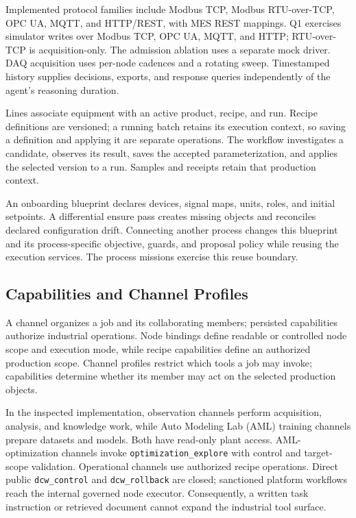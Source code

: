 Implemented protocol families include Modbus TCP, Modbus RTU-over-TCP,
OPC UA, MQTT, and HTTP/REST, with MES REST mappings. Q1 exercises simulator
writes over Modbus TCP, OPC UA, MQTT, and HTTP; RTU-over-TCP is
acquisition-only. The admission ablation uses a separate mock driver.
DAQ acquisition uses per-node cadences and a rotating sweep. Timestamped
history supplies decisions, exports, and response queries independently of
the agent's reasoning duration.

Lines associate equipment with an active product, recipe, and run. Recipe
definitions are versioned; a running batch retains its execution context,
so saving a definition and applying it are separate operations. The workflow
investigates a candidate, observes its result, saves the accepted
parameterization, and applies the selected version to a run. Samples and
receipts retain that production context.

An onboarding blueprint declares devices, signal maps, units, roles, and
initial setpoints. A differential ensure pass creates missing objects and
reconciles declared configuration drift. Connecting another process changes
this blueprint and its process-specific objective, guards, and proposal
policy while reusing the execution services. The process missions exercise
this reuse boundary.
\label{sec:reuse}

\subsection{Capabilities and Channel Profiles}
A channel organizes a job and its collaborating members; persisted
capabilities authorize industrial operations. Node bindings define readable
or controlled node scope and execution mode, while recipe capabilities
define an authorized production scope. Channel profiles restrict which tools
a job may invoke; capabilities determine whether its member may act on the
selected production objects.

In the inspected implementation, observation channels perform
acquisition, analysis, and knowledge work, while Auto Modeling Lab (AML)
training channels prepare datasets and models. Both have read-only plant
access. AML-optimization channels invoke \texttt{optimization\_explore}
with control and target-scope validation. Operational channels use
authorized recipe operations. Direct public \texttt{dcw\_control} and
\texttt{dcw\_rollback} are closed; sanctioned platform workflows reach the
internal governed node executor. Consequently, a written task instruction
or retrieved document cannot expand the industrial tool surface.


